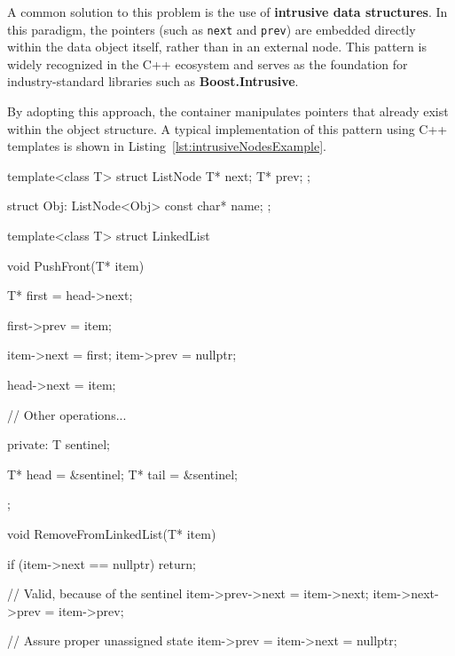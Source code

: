 \documentclass[a4paper,10pt,twoside]{report}
\theoremstyle{definition}
\begin{document}
A common solution to this problem is the use of \textbf{intrusive data structures}. In this paradigm, the pointers (such as \texttt{next} and \texttt{prev}) are embedded directly within the data object itself, rather than in an external node. This pattern is widely recognized in the C++ ecosystem and serves as the foundation for industry-standard libraries such as \textbf{Boost.Intrusive}\cite{boost_intrusive}.

By adopting this approach, the container manipulates pointers that already exist within the object structure. A typical implementation of this pattern using C++ templates is shown in Listing~\ref{lst:intrusiveNodesExample}.

\clearpage

\begin{cppcode}[caption={Intrusive Data Structures Example}, label={lst:intrusiveNodesExample}]
template<class T>
struct ListNode {
    T* next;
    T* prev;
};

struct Obj: ListNode<Obj> {
    const char* name;
};

template<class T>
struct LinkedList {
    void PushFront(T* item) {
        T* first = head->next;
        
        first->prev = item;

        item->next = first;
        item->prev = nullptr;

        head->next = item;
    }

    // Other operations...

private:
    T sentinel{};

    T* head = &sentinel;
    T* tail = &sentinel;
};

void RemoveFromLinkedList(T* item) {
    if (item->next == nullptr) {
        return;
    }

    // Valid, because of the sentinel
    item->prev->next = item->next;
    item->next->prev = item->prev;

    // Assure proper unassigned state
    item->prev = item->next = nullptr;
}

\end{cppcode}
\end{document}
